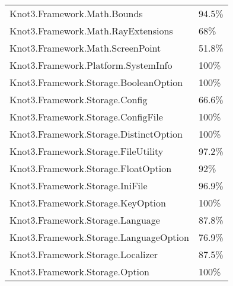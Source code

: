\documentclass[a4paper,10pt]{article}
\begin{document}
\begin{longtable}[l]{ll}
Knot3.Framework.Math.Bounds & 94.5\%\\
Knot3.Framework.Math.RayExtensions & 68\%\\
Knot3.Framework.Math.ScreenPoint & 51.8\%\\
Knot3.Framework.Platform.SystemInfo & 100\%\\
Knot3.Framework.Storage.BooleanOption & 100\%\\
Knot3.Framework.Storage.Config & 66.6\%\\
Knot3.Framework.Storage.ConfigFile & 100\%\\
Knot3.Framework.Storage.DistinctOption & 100\%\\
Knot3.Framework.Storage.FileUtility & 97.2\%\\
Knot3.Framework.Storage.FloatOption & 92\%\\
Knot3.Framework.Storage.IniFile & 96.9\%\\
Knot3.Framework.Storage.KeyOption & 100\%\\
Knot3.Framework.Storage.Language & 87.8\%\\
Knot3.Framework.Storage.LanguageOption & 76.9\%\\
Knot3.Framework.Storage.Localizer & 87.5\%\\
Knot3.Framework.Storage.Option & 100\%\\
\end{longtable}
\end{document}
